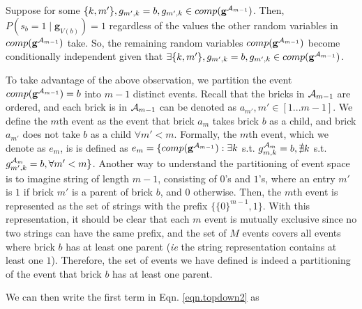 \documentclass[11pt]{article}
\newcommand{\A}{{\cal A}}
\newcommand{\Am}{\A_{m}}
\newcommand{\gcompPrev}{comp(\mathbf{g}^{\A_{m-1}})}
\begin{document}
Suppose for some $\{k,m'\}, g_{m',k} = b, g_{m',k} \in \gcompPrev$. Then, $P(s_b = 1 \mid \mathbf{g}_{V(b)}) = 1$ regardless of the values the other random variables in $\gcompPrev$ take. So, the remaining random variables $\gcompPrev$ become conditionally independent given that $\exists \{k,m'\}, g_{m',k} = b, g_{m',k} \in \gcompPrev$.

To take advantage of the above observation, we partition the event $\gcompPrev = b$ into $m-1$ distinct events. Recall that the bricks in
$\A_{m-1}$ are ordered, and each brick is in $\A_{m-1}$  can be denoted as $a_{m'}, m' \in [1...m-1]$. We define the $m$th event as the event that brick $a_{m}$ takes brick $b$ as a child, and brick $a_{m'}$ does not take $b$ as a child $\forall m' < m$. Formally, the $m$th event, which we denote as $e_m$, is is defined as $e_m = \{\gcompPrev : \exists k$ s.t. $g^{\Am}_{m,k} = b, \nexists k$ s.t. $g^{\Am}_{m',k} = b, \forall m' < m \}$. Another way to understand the partitioning of event space is to imagine string of length $m-1$, consisting of $0$'s and $1$'s, where an entry $m'$ is $1$ if brick $m'$ is a parent of brick $b$, and $0$ otherwise. Then, the $m$th event is represented as the set of strings with the prefix $\{ \{0\}^{m-1},1\}$. With this representation, it should be clear that each $m$ event is mutually exclusive since no two strings can have the same prefix, and the set of $M$ events covers all events where brick $b$ has at least one parent (\emph{ie} the string representation contains at least one $1$). Therefore, the set of events we have defined is indeed a partitioning of the event that brick $b$ has at least one parent.

We can then write the first term in Eqn. \ref{eqn.topdown2} as
\end{document}
